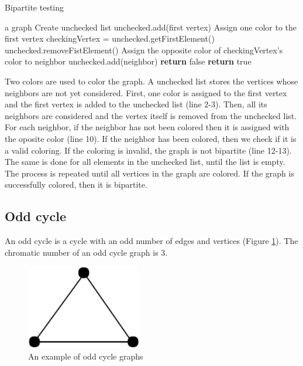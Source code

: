 \documentclass[a4paper]{report}
\begin{document}
			\begin{algorithm}
				\caption{Bipartite testing}
				\label{alg:bipartite}
			
				\begin{algorithmic}[1]
					\REQUIRE a graph
					\STATE Create unchecked list
					\STATE unchecked.add(first vertex)
					\STATE Assign one color to the first vertex
					\STATE checkingVertex = unchecked.getFirstElement()
					\STATE unchecked.removeFistElement()
					\STATE Assign the opposite color of checkingVertex's color to neighbor
					\STATE unchecked.add(neighbor)
					\STATE \textbf{return} false
					\ENDIF
					\ENDFOR
					\ENDWHILE
					\ENDWHILE
					\STATE \textbf{return} true
				\end{algorithmic}
			\end{algorithm}
			 Two colors are used to color the graph. A unchecked list stores the vertices whose neighbors are not yet considered. First, one color is assigned to the first vertex and the first vertex is added to the unchecked list (line 2-3). Then, all its neighbors are considered and the vertex itself is removed from the unchecked list. For each neighbor, if the neighbor has not been colored then it is assigned with the oposite color (line 10). If the neighbor has been colored, then we check if it is a valid coloring. If the coloring is invalid, the graph is not bipartite (line 12-13). The same is done for all elements in the unchecked list, until the list is empty. The process is repeated until all vertices in the graph are colored. If the graph is successfully colored, then it is bipartite.
			\subsection{Odd cycle}
			An odd cycle is a cycle with an odd number of edges and vertices (Figure \ref{fig:oddcycle}). The chromatic number of an odd cycle graph is 3. \\
			
			\begin{figure}[h]
				\centering
				\includegraphics[width=50mm,scale=0.5]{figures/cycle.pdf}
				\caption{An example of odd cycle graphs}
				\label{fig:oddcycle}
			\end{figure}
		
\end{document}
